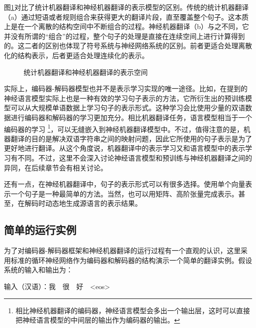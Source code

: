 \parinterval 图\ref{fig:10-6}对比了统计机器翻译和神经机器翻译的表示模型的区别。传统的统计机器翻译（a）通过短语或者规则组合来获得更大的翻译片段，直至覆盖整个句子。这本质上是在一个离散的结构空间中不断组合的过程。神经机器翻译（b）与之不同，它并没有所谓的“组合”的过程，整个句子的处理是直接在连续空间上进行计算得到的。这二者的区别也体现了符号系统与神经网络系统的区别。前者更适合处理离散化的结构表示，后者更适合处理连续化的表示。

\begin{figure}[htp]
    \centering
    
    \caption{统计机器翻译和神经机器翻译的表示空间}
    \label{fig:10-6}
\end{figure}

\parinterval 实际上，编码器-解码器模型也并不是表示学习实现的唯一途径。比如，在{\chapternine}提到的神经语言模型实际上也是一种有效的学习句子表示的方法，它所衍生出的预训练模型可以从大规模单语数据上学习句子的表示形式。这种学习会比使用少量的双语数据进行编码器和解码器的学习更加充分。相比机器翻译任务，语言模型相当于一个编码器的学习 \footnote{相比神经机器翻译的编码器，神经语言模型会多出一个输出层，这时可以直接把神经语言模型的中间层的输出作为编码器的输出。}，可以无缝嵌入到神经机器翻译模型中。不过，值得注意的是，机器翻译的目的是解决双语字符串之间的映射问题，因此它所使用的句子表示是为了更好地进行翻译。从这个角度说，机器翻译中的表示学习又和语言模型中的表示学习有不同。不过，这里不会深入讨论神经语言模型和预训练与神经机器翻译之间的异同，在后续章节会有相关讨论。

\parinterval 还有一点，在神经机器翻译中，句子的表示形式可以有很多选择。使用单个向量表示一个句子是一种最简单的方法。当然，也可以用矩阵、高阶张量完成表示。甚至，在解码时动态地生成源语言的表示结果。

\subsection{简单的运行实例}

\parinterval 为了对编码器-解码器框架和神经机器翻译的运行过程有一个直观的认识，这里采用标准的循环神经网络作为编码器和解码器的结构演示一个简单的翻译实例。假设系统的输入和输出为：

\vspace{0.5em}
\parinterval  \hspace{5em} 输入（汉语）：我\ \ 很\ \  好\ \ <eos>

